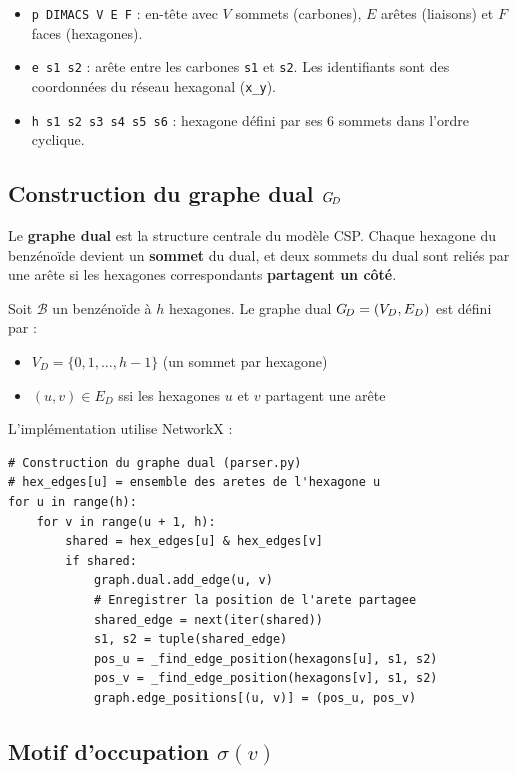 \begin{itemize}
  \item \texttt{p DIMACS V E F} : en-tête avec $V$ sommets (carbones), $E$ arêtes (liaisons)
    et $F$ faces (hexagones).
  \item \texttt{e s1 s2} : arête entre les carbones \texttt{s1} et \texttt{s2}. Les identifiants
    sont des coordonnées du réseau hexagonal (\texttt{x\_y}).
  \item \texttt{h s1 s2 s3 s4 s5 s6} : hexagone défini par ses 6 sommets dans l'ordre
    cyclique.
\end{itemize}

\subsection{Construction du graphe dual $G_{\!D}$}

Le \textbf{graphe dual} est la structure centrale du modèle CSP. Chaque hexagone du benzénoïde
devient un \textbf{sommet} du dual, et deux sommets du dual sont reliés par une arête si les
hexagones correspondants \textbf{partagent un côté}.

\begin{definition}
  Soit $\mathcal{B}$ un benzénoïde à $h$ hexagones. Le graphe dual
  $G_{\!D} = (V_D, E_D)$ est défini par :
  \begin{itemize}
    \item $V_D = \{0, 1, \ldots, h-1\}$ (un sommet par hexagone)
    \item $(u, v) \in E_D$ ssi les hexagones $u$ et $v$ partagent une arête
  \end{itemize}
\end{definition}

L'implémentation utilise NetworkX :

\begin{lstlisting}
# Construction du graphe dual (parser.py)
# hex_edges[u] = ensemble des aretes de l'hexagone u
for u in range(h):
    for v in range(u + 1, h):
        shared = hex_edges[u] & hex_edges[v]
        if shared:
            graph.dual.add_edge(u, v)
            # Enregistrer la position de l'arete partagee
            shared_edge = next(iter(shared))
            s1, s2 = tuple(shared_edge)
            pos_u = _find_edge_position(hexagons[u], s1, s2)
            pos_v = _find_edge_position(hexagons[v], s1, s2)
            graph.edge_positions[(u, v)] = (pos_u, pos_v)
\end{lstlisting}

\subsection{Motif d'occupation $\sigma(v)$}

